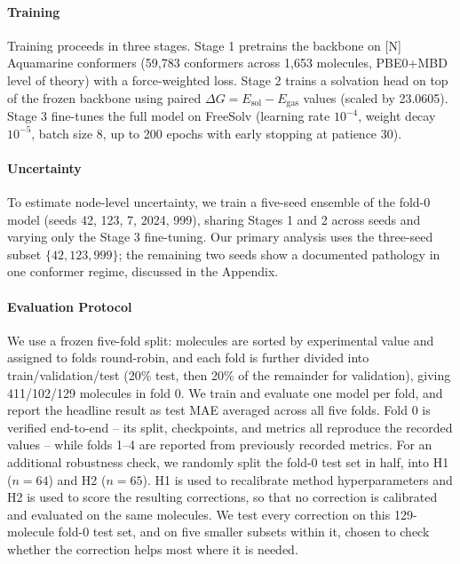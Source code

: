 \documentclass{article}
\begin{document}
\paragraph{Training}  Training proceeds in three stages. Stage 1 pretrains the
backbone on [N] Aquamarine conformers (59{,}783 conformers across 1{,}653
molecules, PBE0+MBD level of theory) with a force-weighted loss. Stage 2
trains a solvation head on top of the frozen backbone using paired
$\Delta G = E_{\mathrm{sol}} - E_{\mathrm{gas}}$ values (scaled by 23.0605).
Stage 3 fine-tunes the full model on FreeSolv (learning rate $10^{-4}$,
weight decay $10^{-5}$, batch size 8, up to 200 epochs with early stopping
at patience 30).

\paragraph{Uncertainty} To estimate node-level uncertainty, we train a
five-seed ensemble of the fold-0 model (seeds 42, 123, 7, 2024, 999), sharing
Stages 1 and 2 across seeds and varying only the Stage 3 fine-tuning. Our
primary analysis uses the three-seed subset $\{42, 123, 999\}$; the remaining
two seeds show a documented pathology in one conformer regime, discussed in
the Appendix.

\paragraph{Evaluation Protocol} We use a frozen five-fold split: molecules are
sorted by experimental value and assigned to folds round-robin, and each fold
is further divided into train/validation/test (20\% test, then 20\% of the
remainder for validation), giving 411/102/129 molecules in fold 0. We train
and evaluate one model per fold, and report the headline result as test MAE
averaged across all five folds. Fold 0 is verified end-to-end -- its split,
checkpoints, and metrics all reproduce the recorded values -- while folds
1--4 are reported from previously recorded metrics. For an additional
robustness check, we randomly split the fold-0 test set in half, into H1
($n=64$) and H2 ($n=65$). H1 is used to recalibrate method hyperparameters
and H2 is used to score the resulting corrections, so that no correction is
calibrated and evaluated on the same molecules. We test every correction on this 129-molecule fold-0 test set, and on five smaller subsets within it, chosen to check whether the correction helps most where it is needed.
\end{document}
